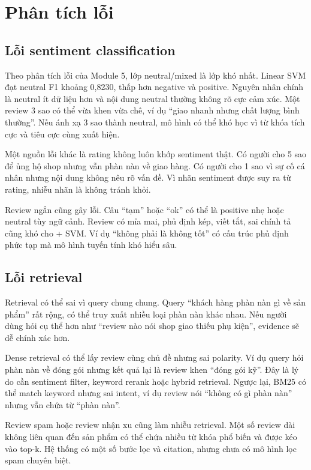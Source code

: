 \chapter{Phân tích lỗi}
\section{Lỗi sentiment classification}
Theo phân tích lỗi của Module 5, lớp neutral/mixed là lớp khó nhất. Linear SVM đạt neutral F1 khoảng 0,8230, thấp hơn negative và positive. Nguyên nhân chính là neutral ít dữ liệu hơn và nội dung neutral thường không rõ cực cảm xúc. Một review 3 sao có thể vừa khen vừa chê, ví dụ “giao nhanh nhưng chất lượng bình thường”. Nếu ánh xạ 3 sao thành neutral, mô hình có thể khó học vì từ khóa tích cực và tiêu cực cùng xuất hiện.

Một nguồn lỗi khác là rating không luôn khớp sentiment thật. Có người cho 5 sao để ủng hộ shop nhưng vẫn phàn nàn về giao hàng. Có người cho 1 sao vì sự cố cá nhân nhưng nội dung không nêu rõ vấn đề. Vì nhãn sentiment được suy ra từ rating, nhiễu nhãn là không tránh khỏi.

Review ngắn cũng gây lỗi. Câu “tạm” hoặc “ok” có thể là positive nhẹ hoặc neutral tùy ngữ cảnh. Review có mỉa mai, phủ định kép, viết tắt, sai chính tả cũng khó cho \TFIDF{} + SVM. Ví dụ “không phải là không tốt” có cấu trúc phủ định phức tạp mà mô hình tuyến tính khó hiểu sâu.

\section{Lỗi retrieval}
Retrieval có thể sai vì query chung chung. Query “khách hàng phàn nàn gì về sản phẩm” rất rộng, có thể truy xuất nhiều loại phàn nàn khác nhau. Nếu người dùng hỏi cụ thể hơn như “review nào nói shop giao thiếu phụ kiện”, evidence sẽ dễ chính xác hơn.

Dense retrieval có thể lấy review cùng chủ đề nhưng sai polarity. Ví dụ query hỏi phàn nàn về đóng gói nhưng kết quả lại là review khen “đóng gói kỹ”. Đây là lý do cần sentiment filter, keyword rerank hoặc hybrid retrieval. Ngược lại, BM25 có thể match keyword nhưng sai intent, ví dụ review nói “không có gì phàn nàn” nhưng vẫn chứa từ “phàn nàn”.

Review spam hoặc review nhận xu cũng làm nhiễu retrieval. Một số review dài không liên quan đến sản phẩm có thể chứa nhiều từ khóa phổ biến và được kéo vào top-k. Hệ thống có một số bước lọc và citation, nhưng chưa có mô hình lọc spam chuyên biệt.

